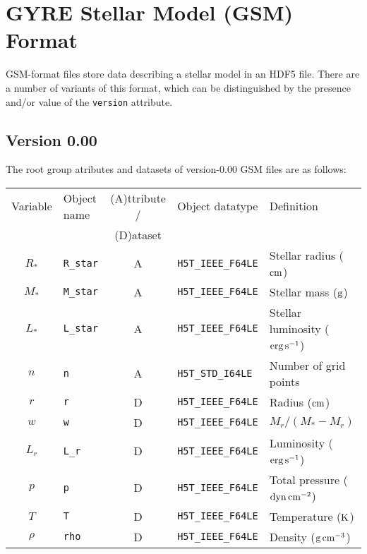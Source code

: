 \documentclass{article}
\newcommand{\Rstar}{\ensuremath{R_{\ast}}}
\newcommand{\Mstar}{\ensuremath{M_{\ast}}}
\newcommand{\Lstar}{\ensuremath{L_{\ast}}}
\newcommand{\cm}{\ensuremath{{\rm cm}}}
\newcommand{\gram}{\ensuremath{{\rm g}}}
\newcommand{\second}{\ensuremath{{\rm s}}}
\newcommand{\dyne}{\ensuremath{{\rm dyn}}}
\newcommand{\erg}{\ensuremath{{\rm erg}}}
\newcommand{\kelvin}{\ensuremath{{\rm K}}}
\begin{document}
\section*{GYRE Stellar Model (GSM) Format}

GSM-format files store data describing a stellar model in an HDF5
file. There are a number of variants of this format, which can be
distinguished by the presence and/or value of the \texttt{version}
attribute.

\subsection*{Version 0.00}

The root group atributes and datasets of version-0.00 GSM files are as follows:

\begin{table}[h!]
\begin{tabular}{|c|l|c|l|l|} \hline
Variable & Object name & (A)ttribute / & Object datatype & Definition \\
         &             & (D)ataset     &                 &            \\ \hline
\Rstar            & \texttt{R\_star}      & A & \texttt{H5T\_IEEE\_F64LE} & Stellar radius ($\cm$) \\
\Mstar            & \texttt{M\_star}      & A & \texttt{H5T\_IEEE\_F64LE} & Stellar mass ($\gram$) \\
\Lstar            & \texttt{L\_star}      & A & \texttt{H5T\_IEEE\_F64LE} & Stellar luminosity ($\erg\,\second^{-1}$) \\
$n$               & \texttt{n}            & A &\texttt{H5T\_STD\_I64LE}  & Number of grid points \\ 
$r$               & \texttt{r}            & D & \texttt{H5T\_IEEE\_F64LE} & Radius ($\cm$) \\
$w$               & \texttt{w}            & D & \texttt{H5T\_IEEE\_F64LE} & $M_{r}/(\Mstar-M_{r})$ \\
$L_{r}$           & \texttt{L\_r}         & D & \texttt{H5T\_IEEE\_F64LE} & Luminosity ($\erg\,\second^{-1}$) \\
$p$               & \texttt{p}            & D & \texttt{H5T\_IEEE\_F64LE} & Total pressure ($\dyne\,\cm^{-2}$) \\
$T$               & \texttt{T}            & D & \texttt{H5T\_IEEE\_F64LE} & Temperature ($\kelvin$) \\
$\rho$            & \texttt{rho}          & D & \texttt{H5T\_IEEE\_F64LE} & Density ($\gram\,\cm^{-3}$) \\

\end{tabular}
\end{table}
\end{document}
